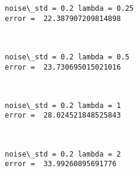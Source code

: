\documentclass[11pt]{article}
\begin{document}
    \begin{Verbatim}[commandchars=\\\{\}]
noise\_std = 0.2 lambda = 0.25
error =  22.387907209814898

    \end{Verbatim}

    \begin{center}
    \end{center}
    { \hspace*{\fill} \\}
    
    \begin{Verbatim}[commandchars=\\\{\}]
noise\_std = 0.2 lambda = 0.5
error =  23.730695015021016

    \end{Verbatim}

    \begin{center}
    \end{center}
    { \hspace*{\fill} \\}
    
    \begin{Verbatim}[commandchars=\\\{\}]
noise\_std = 0.2 lambda = 1
error =  28.024521848525843

    \end{Verbatim}

    \begin{center}
    \end{center}
    { \hspace*{\fill} \\}
    
    \begin{Verbatim}[commandchars=\\\{\}]
noise\_std = 0.2 lambda = 2
error =  33.99260895691776

    \end{Verbatim}

    \begin{center}
    \end{center}
    { \hspace*{\fill} \\}
    
\end{document}
